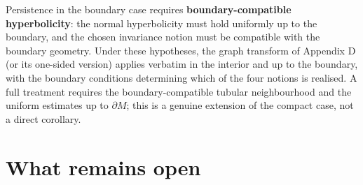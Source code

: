 \documentclass[11pt,a4paper]{article}
\theoremstyle{plain}
\theoremstyle{definition}
\theoremstyle{remark}
\numberwithin{equation}{section}
\numberwithin{figure}{section}
\begin{document}
Persistence in the boundary case requires \textbf{boundary-compatible hyperbolicity}: the normal hyperbolicity must hold uniformly up to the boundary, and the chosen invariance notion must be compatible with the boundary geometry. Under these hypotheses, the graph transform of Appendix D (or its one-sided version) applies verbatim in the interior and up to the boundary, with the boundary conditions determining which of the four notions is realised. A full treatment requires the boundary-compatible tubular neighbourhood and the uniform estimates up to \(\partial M\); this is a genuine extension of the compact case, not a direct corollary.

\section{What remains open}
\end{document}
